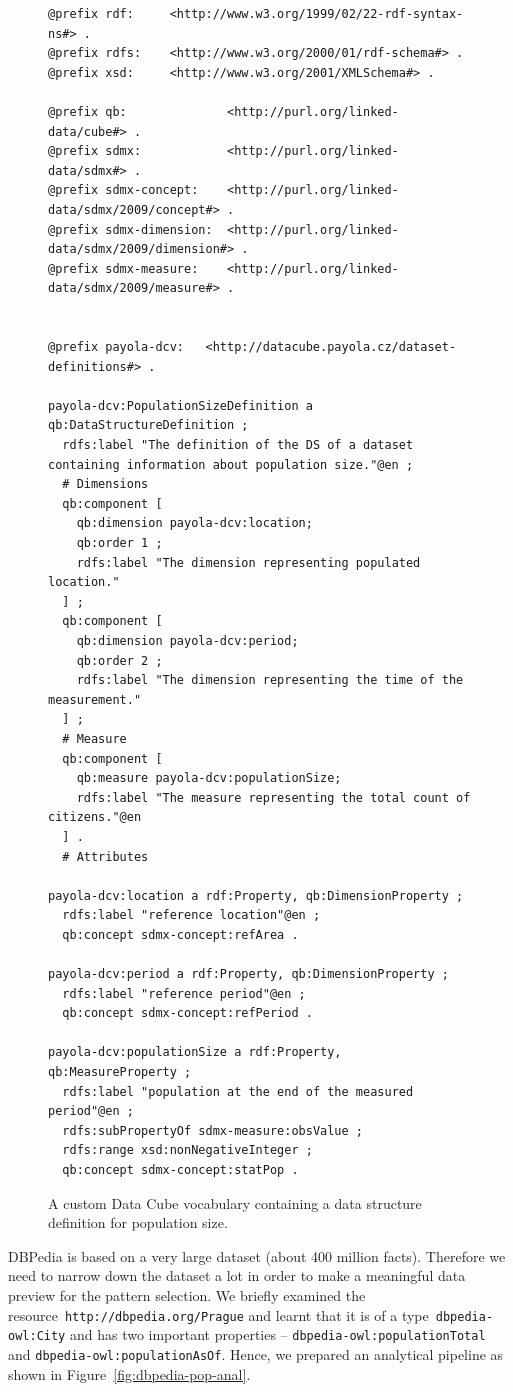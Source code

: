 \begin{figure}
  \scriptsize
  \begin{verbatim}
@prefix rdf:     <http://www.w3.org/1999/02/22-rdf-syntax-ns#> .
@prefix rdfs:    <http://www.w3.org/2000/01/rdf-schema#> .
@prefix xsd:     <http://www.w3.org/2001/XMLSchema#> .

@prefix qb:              <http://purl.org/linked-data/cube#> .
@prefix sdmx:            <http://purl.org/linked-data/sdmx#> .
@prefix sdmx-concept:    <http://purl.org/linked-data/sdmx/2009/concept#> .
@prefix sdmx-dimension:  <http://purl.org/linked-data/sdmx/2009/dimension#> .
@prefix sdmx-measure:    <http://purl.org/linked-data/sdmx/2009/measure#> .


@prefix payola-dcv:   <http://datacube.payola.cz/dataset-definitions#> .

payola-dcv:PopulationSizeDefinition a qb:DataStructureDefinition ;
  rdfs:label "The definition of the DS of a dataset containing information about population size."@en ;
  # Dimensions
  qb:component [
    qb:dimension payola-dcv:location;
    qb:order 1 ;
    rdfs:label "The dimension representing populated location."
  ] ;
  qb:component [	
    qb:dimension payola-dcv:period;
    qb:order 2 ;
    rdfs:label "The dimension representing the time of the measurement."
  ] ;
  # Measure
  qb:component [
    qb:measure payola-dcv:populationSize;
    rdfs:label "The measure representing the total count of citizens."@en
  ] .
  # Attributes

payola-dcv:location a rdf:Property, qb:DimensionProperty ;
  rdfs:label "reference location"@en ;
  qb:concept sdmx-concept:refArea .

payola-dcv:period a rdf:Property, qb:DimensionProperty ;
  rdfs:label "reference period"@en ;
  qb:concept sdmx-concept:refPeriod .

payola-dcv:populationSize a rdf:Property, qb:MeasureProperty ;
  rdfs:label "population at the end of the measured period"@en ;
  rdfs:subPropertyOf sdmx-measure:obsValue ;
  rdfs:range xsd:nonNegativeInteger ;
  qb:concept sdmx-concept:statPop .
  \end{verbatim}
  \caption{A custom Data Cube vocabulary containing a data structure definition for population size.}
  \label{fig:dcv-dbpedia-dsd}
\end{figure}

\begin{sloppypar}
DBPedia is based on a very large dataset (about 400 million facts). Therefore we 
need to narrow down the dataset a lot in order to make a meaningful data preview for 
the
pattern selection. We briefly examined the resource~\texttt{http://dbpedia.org/Prague} 
and learnt that it is of a type~\texttt{dbpedia-owl:City} and has two 
important properties -- \texttt{dbpedia-owl:populationTotal} and 
\texttt{dbpedia-owl:populationAsOf}. Hence, we prepared an analytical pipeline 
as shown in Figure~\ref{fig:dbpedia-pop-anal}.
\end{sloppypar}

